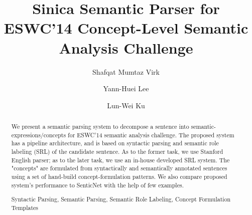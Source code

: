 \documentclass[runningheads,a4paper]{llncs}
\newcommand{\keywords}[1]{\par\addvspace\baselineskip
\noindent\keywordname\enspace\ignorespaces#1}
\begin{document}
\mainmatter  %

\title{Sinica Semantic Parser for ESWC'14 Concept-Level Semantic Analysis Challenge }


%
%
\author{Shafqat Mumtaz Virk%
\and Yann-Huei Lee\and Lun-Wei Ku}
%


%
%

\maketitle



\begin{abstract}
We present a semantic parsing system to decompose a sentence into semantic-expressions/concepts for ESWC'14 semantic analysis challenge. The proposed system has a pipeline architecture, and is based on syntactic parsing and semantic role labeling (SRL) of the candidate sentence. As to the former task, we use Stanford English parser; as to the later task, we use an in-house developed SRL system. The "concepts" are formulated from syntactically and semantically annotated sentences using a set of hand-build concept-formulation patterns. We also compare proposed system's performance to SenticNet with the help of few examples.
\keywords{Syntactic Parsing, Semantic Parsing, Semantic Role Labeling, Concept Formulation Templates}                 
\end{abstract}
\end{document}
